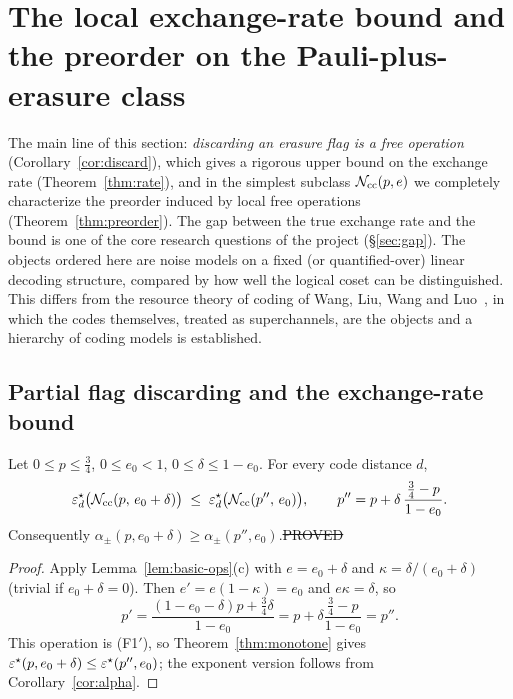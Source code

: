 \section{The local exchange-rate bound and the preorder on the Pauli-plus-erasure class}\label{sec:exchange}

The main line of this section: \emph{discarding an erasure flag is a free operation} (Corollary~\ref{cor:discard}), which gives a rigorous upper bound on the exchange rate (Theorem~\ref{thm:rate}),
and in the simplest subclass $\mathcal{N}_{\rm cc}(p,e)$ we completely characterize the preorder induced by local free operations (Theorem~\ref{thm:preorder}).
The gap between the true exchange rate and the bound is one of the core research questions of the project (\S\ref{sec:gap}).
The objects ordered here are noise models on a fixed (or quantified-over) linear decoding structure, compared by how well the logical coset can be distinguished. This differs from the resource theory of coding of Wang, Liu, Wang and Luo~\cite{WLWL}, in which the codes themselves, treated as superchannels, are the objects and a hierarchy of coding models is established.

\subsection{Partial flag discarding and the exchange-rate bound}

\begin{theorem}\label{thm:partial}
Let $0\le p\le\tfrac34$, $0\le e_0<1$, $0\le\delta\le1-e_0$. For every code distance $d$,
\[
\varepsilon^{\star}_d\big(\mathcal{N}_{\rm cc}(p,\,e_0+\delta)\big)\;\le\;\varepsilon^{\star}_d\big(\mathcal{N}_{\rm cc}(p'',\,e_0)\big),\qquad
p''=p+\delta\,\frac{\tfrac34-p}{1-e_0}.
\]
Consequently $\alpha_\pm(p,e_0+\delta)\ge\alpha_\pm(p'',e_0)$.\hfill\st{PROVED}
\end{theorem}
\begin{proof}
Apply Lemma~\ref{lem:basic-ops}(c) with $e=e_0+\delta$ and $\kappa=\delta/(e_0+\delta)$ (trivial if $e_0+\delta=0$).
Then $e'=e(1-\kappa)=e_0$ and $e\kappa=\delta$, so
\[
p'=\frac{(1-e_0-\delta)p+\tfrac34\delta}{1-e_0}=p+\delta\frac{\tfrac34-p}{1-e_0}=p''.
\]
This operation is (F1$'$), so Theorem~\ref{thm:monotone} gives $\varepsilon^{\star}(p,e_0+\delta)\le\varepsilon^{\star}(p'',e_0)$;
the exponent version follows from Corollary~\ref{cor:alpha}.
\end{proof}

